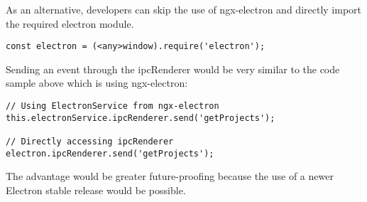 As an alternative, developers can skip the use of ngx-electron and directly import the required electron module.
\begin{lstlisting}
const electron = (<any>window).require('electron');
\end{lstlisting}
Sending an event through the ipcRenderer would be very similar to the code sample above which is using 
ngx-electron:
\begin{lstlisting}
// Using ElectronService from ngx-electron
this.electronService.ipcRenderer.send('getProjects');

// Directly accessing ipcRenderer
electron.ipcRenderer.send('getProjects');
\end{lstlisting}
The advantage would be greater future-proofing because the use of a newer Electron stable release would
be possible.